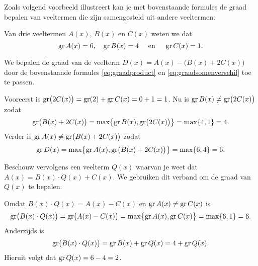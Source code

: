 \documentclass{ximera}
\begin{document}
Zoals volgend voorbeeld illustreert kan je met bovenstaande formules de graad bepalen van veeltermen die zijn samengesteld uit andere veeltermen: 
\begin{example} 

\begin{question}

Van drie veeltermen $A(x)$, $B(x)$ en $C(x)$ weten we dat
\[
\operatorname{gr} A(x) = 6, \quad \operatorname{gr} B(x) = 4 \quad \text{ en } \quad \operatorname{gr} C(x) = 1.
\]

We bepalen de graad van de veelterm $D(x) = A(x) - \bigl(B(x) + 2C(x)\bigr)$ door de bovenstaande formules \eqref{eq:graadproduct} en \eqref{eq:graadsomenverschil} toe te passen. 

Vooreerst is $\operatorname{gr}\bigl(2C(x)\bigr) = \operatorname{gr}(2) + \operatorname{gr} C(x) = 0 + 1 = 1$. Nu is $\operatorname{gr} B(x) \neq \operatorname{gr}\bigl(2C(x)\bigr)$ zodat
\[
\operatorname{gr} \bigl(B(x) + 2C(x)\bigr) = \max \bigl\{\operatorname{gr} B(x),\operatorname{gr}\bigl(2C(x)\bigr)\bigr\} = \max\{4,1\} = 4.
\]
Verder is $\operatorname{gr} A(x) \neq \operatorname{gr}\bigl(B(x) + 2C(x)\bigr)$ zodat 
\[
\operatorname{gr} D(x) = \max \bigl\{\operatorname{gr} A(x),\operatorname{gr}\bigl(B(x) + 2C(x)\bigr)\bigr\} = \max\{6,4\} = 6.
\]

\end{question}	

\begin{question}


Beschouw vervolgens een veelterm $Q(x)$ waarvan je weet dat $A(x) = B(x)\cdot Q(x) + C(x)$. We gebruiken dit verband om de graad van $Q(x)$ te bepalen. 

Omdat $B(x)\cdot Q(x) = A(x) - C(x)$ en $\operatorname{gr} A(x) \neq \operatorname{gr} C(x)$ is
\[
\operatorname{gr}\bigl(B(x)\cdot Q(x)\bigr) = \operatorname{gr}\bigl(A(x) - C(x)\bigr) = \max \bigl\{\operatorname{gr} A(x),\operatorname{gr} C(x)\bigr\} = \max\{6,1\} = 6.
\]
Anderzijds is 
\[
\operatorname{gr}\bigl(B(x)\cdot Q(x)\bigr) = \operatorname{gr} B(x) + \operatorname{gr} Q(x) = 4 + \operatorname{gr} Q(x).
\]
Hieruit volgt dat $\operatorname{gr} Q(x) = 6-4 = 2$. 

\end{question}

\end{example} 
\end{document}
